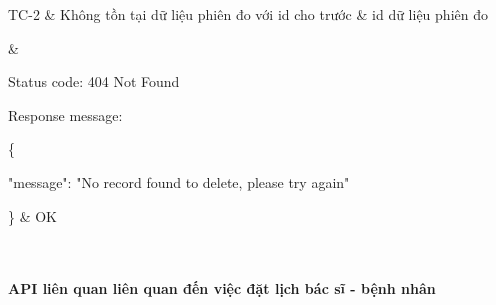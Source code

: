 \begin{enumerate}[a)]
\begin{xltabular}{\textwidth}
		      TC-2
		      & Không tồn tại dữ liệu phiên đo với id cho trước
		      & id dữ liệu phiên đo

		      &

		      Status code: 404 Not Found

		      Response message:

		      \{

		      "message": "No record found to delete, please try again"

		      \}
		      & OK

		      \\ \hline


	      \end{xltabular}


\end{enumerate}


\paragraph{API liên quan liên quan đến việc đặt lịch bác sĩ - bệnh nhân}
\mbox{}

